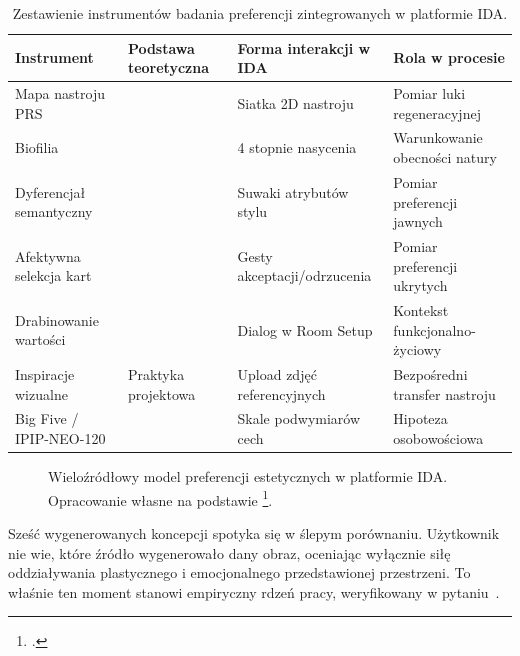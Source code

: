 \begin{table}[htbp]
  \centering
  \caption{Zestawienie instrumentów badania preferencji zintegrowanych w platformie IDA.}
  \label{tab:ch03:instruments}
  \begin{tabular}{@{}p{}p{}p{}p{}@{}}
    \toprule
    Instrument & Podstawa teoretyczna & Forma interakcji w IDA & Rola w procesie \\
    \midrule
    Mapa nastroju PRS
      & \textcite{hartig1997prs,kaplan1995restorative}
      & Siatka 2D nastroju
      & Pomiar luki regeneracyjnej \\
    Biofilia
      & \textcite{kellert2008biophilic}
      & 4 stopnie nasycenia
      & Warunkowanie obecności natury \\
    Dyferencjał semantyczny
      & \textcite{osgood1957measurement}
      & Suwaki atrybutów stylu
      & Pomiar preferencji jawnych \\
    Afektywna selekcja kart
      & \textcite{greenwald1998iat}
      & Gesty akceptacji/odrzucenia
      & Pomiar preferencji ukrytych \\
    Drabinowanie wartości
      & \textcite{reynolds1988laddering}
      & Dialog w Room Setup
      & Kontekst funkcjonalno-życiowy \\
    Inspiracje wizualne
      & Praktyka projektowa
      & Upload zdjęć referencyjnych
      & Bezpośredni transfer nastroju \\
    Big Five / IPIP-NEO-120
      & \textcite{john2008bigfive,gosling2002room}
      & Skale podwymiarów cech
      & Hipoteza osobowościowa \\
    \bottomrule
  \end{tabular}
\end{table}

\begin{figure}[htbp]
  \centering
  \caption[Wieloźródłowy model preferencji estetycznych w platformie IDA. Opracowanie własne na podstawie artefaktu.]{Wieloźródłowy model preferencji estetycznych w platformie IDA.
    Opracowanie własne na podstawie \footcite{idaPlatform2026}.}
  \label{fig:ch03:multisource}
\end{figure}

Sześć wygenerowanych koncepcji spotyka się w ślepym porównaniu. Użytkownik nie wie, które źródło wygenerowało dany obraz, oceniając wyłącznie siłę oddziaływania plastycznego i emocjonalnego przedstawionej przestrzeni. To właśnie ten moment stanowi empiryczny rdzeń pracy, weryfikowany w pytaniu~.
